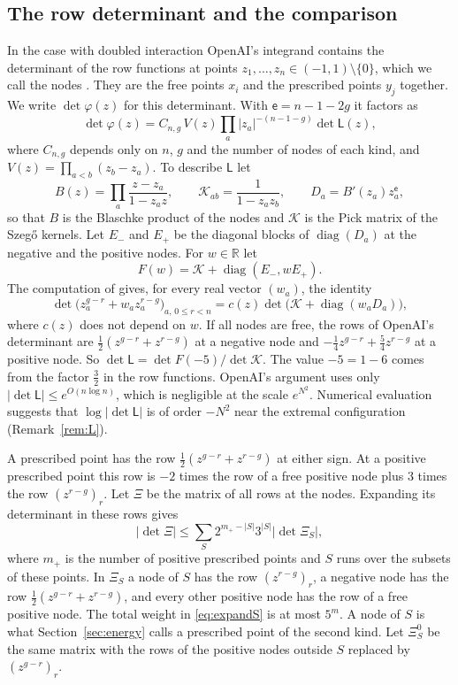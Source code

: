 \documentclass[11pt]{amsart}
\theoremstyle{definition}
\theoremstyle{remark}
\numberwithin{equation}{section}
\newcommand{\R}{\mathbb R}
\newcommand{\cK}{\mathcal K}
\begin{document}
\subsection{The row determinant and the comparison}\label{ssec:rowdet}
In the case with doubled interaction OpenAI's integrand contains the determinant of the row functions at
points $z_1,\ldots,z_n\in(-1,1)\setminus\{0\}$, which we call the nodes \cite[Prop.~5.2]{OpenAI2026}. They are
the free points $x_i$ and the prescribed points $y_j$ together. We write $\det\varphi(z)$ for this determinant. With $\mathsf e=n-1-2g$ it factors as
\begin{equation}\label{eq:detphi}
 \det\varphi(z)=C_{n,g}\,V(z)\prod_a|z_a|^{-(n-1-g)}\det\mathsf L(z),
\end{equation}
where $C_{n,g}$ depends only on $n$, $g$ and the number of nodes of each kind, and $V(z)=\prod_{a<b}(z_b-z_a)$. To describe $\mathsf L$ let
\[
 B(z)=\prod_a\frac{z-z_a}{1-z_az},\qquad \cK_{ab}=\frac1{1-z_az_b},\qquad D_a=B'(z_a)z_a^{\mathsf e},
\]
so that $B$ is the Blaschke product of the nodes and $\cK$ is the Pick matrix of the Szeg\H{o} kernels. Let
$E_-$ and $E_+$ be the diagonal blocks of $\operatorname{diag}(D_a)$ at the negative and the positive nodes.
For $w\in\R$ let
\[
 F(w)=\cK+\operatorname{diag}(E_-,wE_+).
\]
The computation of \cite[Prop.~5.2]{OpenAI2026} gives, for every real vector $(w_a)$, the identity
\begin{equation}\label{eq:laurent}
 \det\bigl(z_a^{g-r}+w_az_a^{r-g}\bigr)_{a,\,0\le r<n}=c(z)\det\bigl(\cK+\operatorname{diag}(w_aD_a)\bigr),
\end{equation}
where $c(z)$ does not depend on $w$. If all nodes are free, the rows of OpenAI's determinant are
$\frac12(z^{g-r}+z^{r-g})$ at a negative node and $-\frac14z^{g-r}+\frac54z^{r-g}$ at a positive node. So
$\det\mathsf L=\det F(-5)/\det\cK$. The value $-5=1-6$ comes from the factor $\frac32$ in the row functions.
OpenAI's argument uses only $|\det\mathsf L|\le e^{O(n\log n)}$, which is negligible at the scale $e^{N^2}$. Numerical
evaluation suggests that $\log|\det\mathsf L|$ is of order $-N^2$ near the extremal configuration
(Remark~\ref{rem:L}).

A prescribed point has the row $\frac12(z^{g-r}+z^{r-g})$ at either sign. At a positive prescribed point this row
is $-2$ times the row of a free positive node plus $3$ times the row $(z^{r-g})_r$. Let $\Xi$ be the matrix of
all rows at the nodes. Expanding its determinant in these rows gives
\begin{equation}\label{eq:expandS}
 |\det\Xi|\le\sum_{S}2^{m_+-|S|}3^{|S|}|\det\Xi_S|,
\end{equation}
where $m_+$ is the number of positive prescribed points and $S$ runs over the subsets of these points. In
$\Xi_S$ a node of $S$ has the row $(z^{r-g})_r$, a negative node has the row $\frac12(z^{g-r}+z^{r-g})$,
and every other positive node has the row of a free positive node. The total weight in \eqref{eq:expandS} is at
most $5^m$. A node of $S$ is what Section~\ref{sec:energy} calls a prescribed point of the second kind. Let
$\Xi^0_S$ be the same matrix with the rows of the positive nodes outside $S$ replaced by $(z^{g-r})_r$.
\end{document}
